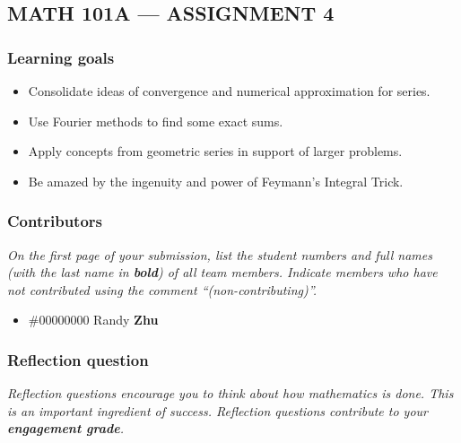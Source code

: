 \documentclass[answers]{exam}
\begin{document}
\subsection*{MATH 101A --- ASSIGNMENT 4}

\subsubsection*{Learning goals}
\begin{itemize}
    \setlength\itemsep{0.1em}
    \item Consolidate ideas of convergence and numerical approximation for series.
    \item Use Fourier methods to find some exact sums.
    \item Apply concepts from geometric series in support of larger problems.
    \item Be amazed by the ingenuity and power of Feymann's Integral Trick.
\end{itemize}

\subsubsection*{Contributors}

\textit{On the first page of your submission, list the student numbers and full names (with the last name in \textbf{bold}) of all team members. Indicate members who have not contributed using the comment ``(non-contributing)''.}

\begin{itemize}
    \item \#00000000 Randy {\bf Zhu}
\end{itemize}

\subsubsection*{Reflection question}

\textit{Reflection questions encourage you to think about how mathematics is done. This is an important ingredient of success. Reflection questions contribute to your \textbf{engagement grade}.}
\end{document}
